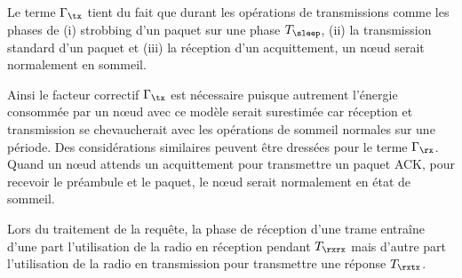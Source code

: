 Le terme $\Gamma_\tx$ tient du fait que durant les opérations de transmissions comme les phases de
(i) strobbing d'un paquet sur une phase $T_\sleep$,
(ii) la transmission standard d'un paquet et
(iii) la réception d'un acquittement, un nœud serait normalement en sommeil.

Ainsi le facteur correctif $\Gamma_\tx$ est nécessaire puisque autrement l'énergie consommée par un nœud avec ce modèle serait surestimée car réception et transmission se chevaucherait avec les opérations de sommeil normales sur une période.
Des considérations similaires peuvent être dressées pour le terme $\Gamma_\rx$. Quand un nœud attends un acquittement pour transmettre un paquet \ac{ACK}, pour recevoir le préambule et le paquet, le nœud serait normalement en état de sommeil.

Lors du traitement de la requête, la phase de réception d'une trame entraîne d'une part l'utilisation de la radio en réception pendant $T_{\rxrx}$ mais d'autre part l'utilisation de la radio en transmission pour transmettre une réponse $T_{\rxtx}$.
